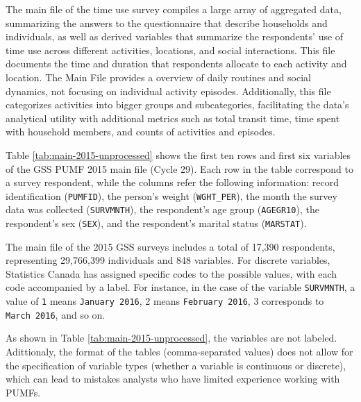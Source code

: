 \documentclass[Royal,times,sageh]{sagej}
\begin{document}
The main file of the time use survey compiles a large array of
aggregated data, summarizing the answers to the questionnaire that
describe households and individuals, as well as derived variables that
summarize the respondents' use of time use across different activities,
locations, and social interactions. This file documents the time and
duration that respondents allocate to each activity and location. The
Main File provides a overview of daily routines and social dynamics, not
focusing on individual activity episodes. Additionally, this file
categorizes activities into bigger groups and subcategories,
facilitating the data's analytical utility with additional metrics such
as total transit time, time spent with household members, and counts of
activities and episodes.

Table \ref{tab:main-2015-unprocessed} shows the first ten rows and first
six variables of the GSS PUMF 2015 main file (Cycle 29). Each row in the
table correspond to a survey respondent, while the columns refer the
following information: record identification (\texttt{PUMFID}), the
person's weight (\texttt{WGHT\_PER}), the month the survey data was
collected (\texttt{SURVMNTH}), the respondent's age group
(\texttt{AGEGR10}), the respondent's sex (\texttt{SEX}), and the
respondent's marital status (\texttt{MARSTAT}).

The main file of the 2015 GSS surveys includes a total of 17,390
respondents, representing 29,766,399 individuals and 848 variables. For
discrete variables, Statistics Canada has assigned specific codes to the
possible values, with each code accompanied by a label. For instance, in
the case of the variable \texttt{SURVMNTH}, a value of \texttt{1} means
\texttt{January\ 2016}, 2 means \texttt{February\ 2016}, 3 corresponds
to \texttt{March\ 2016}, and so on.

As shown in Table \ref{tab:main-2015-unprocessed}, the variables are not
labeled. Adittionaly, the format of the tables (comma-separated values)
does not allow for the specification of variable types (whether a
variable is continuous or discrete), which can lead to mistakes analysts
who have limited experience working with PUMFs.

\begingroup\fontsize{8}{10}\selectfont
\end{document}
